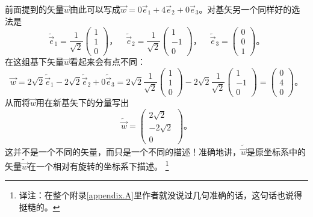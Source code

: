 前面提到的矢量$\vec{w}$由此可以写成$\vec{w}= 0\vec{e}_1 + 4\vec{e}_2 + 0\vec{e}_3$。对基矢另一个同样好的选法是
\begin{equation}
\tilde{\vec{e}}_1 = \frac{1}{\sqrt{2}} \begin{pmatrix}
1 \\ 1 \\ 0
\end{pmatrix}\text{，}\quad
\tilde{\vec{e}}_2 = \frac{1}{\sqrt{2}} \begin{pmatrix}
1 \\ -1 \\ 0
\end{pmatrix} \text{，}\quad
\tilde{\vec{e}}_3 = \begin{pmatrix}
0 \\ 0 \\ 1
\end{pmatrix}\text{。}
\end{equation}
在这组基下矢量$\vec{w}$看起来会有点不同：
\begin{equation}
\vec{w}= 2\sqrt{2}\tilde{\vec{e}}_1 -2\sqrt{2}\tilde{\vec{e}}_2 + 0\tilde{\vec{e}}_3
= 2\sqrt{2} \frac{1}{\sqrt{2}} \begin{pmatrix}
1 \\ 1 \\ 0
\end{pmatrix}-2\sqrt{2}
\frac{1}{\sqrt{2}} \begin{pmatrix}
1 \\ -1 \\ 0
\end{pmatrix} =\begin{pmatrix}
0\\4\\0
\end{pmatrix} \text{。}
\end{equation}
从而将$\vec{w}$用在新基矢下的分量写出
\[
\tilde{\vec{w}} = \begin{pmatrix}
2\sqrt{2} \\ -2\sqrt{2} \\ 0
\end{pmatrix}\text{。}
\]
这并不是一个不同的矢量，而只是一个不同的描述！准确地讲，$\tilde{\vec{w}}$是原坐标系中的矢量$\tilde{\vec{w}}$在一个相对有旋转的坐标系下描述。%
\footnote{译注：在整个附录\ref{appendix.A}里作者就没说过几句准确的话，这句话也说得挺糙的。}


